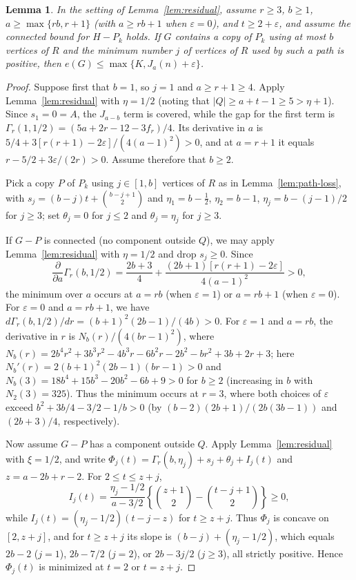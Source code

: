 \documentclass[10pt]{article}
\theoremstyle{compactplain}
\newtheorem{lemma}[theorem]{Lemma}
\theoremstyle{remark}\newtheorem{remark}[theorem]{Remark}
\begin{document}
\begin{lemma}\label{lem:positive-core-use}
In the setting of Lemma~\ref{lem:residual}, assume $r\ge3$, $b\ge1$,
$a\ge\max\{rb,r+1\}$ (with $a\ge rb+1$ when $\varepsilon=0$), and
$t\ge2+\varepsilon$, and assume the connected bound for $H-P_k$ holds.
If $G$ contains a copy of $P_k$ using at most $b$ vertices of $R$ and
the minimum number $j$ of vertices of $R$ used by such a path is
positive, then $e(G)\le\max\{K,J_a(n)+\varepsilon\}$.
\end{lemma}
\begin{proof}
Suppose first that $b=1$, so $j=1$ and $a\ge r+1\ge4$. Apply
Lemma~\ref{lem:residual} with $\eta=1/2$ (noting that
$|Q|\ge a+t-1\ge5>\eta+1$). Since $s_1=0=A$, the $J_{a-b}$ term is
covered, while the gap for the first term is
$\Gamma_r(1,1/2)=(5a+2r-12-3f_r)/4$. Its derivative in $a$ is
$5/4+3[r(r+1)-2\varepsilon]/(4(a-1)^2)>0$, and at $a=r+1$ it equals
$r-5/2+3\varepsilon/(2r)>0$. Assume therefore that $b\ge2$.

Pick a copy $P$ of $P_k$ using $j\in[1,b]$ vertices of $R$ as in
Lemma~\ref{lem:path-loss}, with $s_j=(b-j)t+\binom{b-j+1}{2}$ and
$\eta_1=b-\tfrac{1}{2}$, $\eta_2=b-1$, $\eta_j=b-(j-1)/2$ for $j\ge3$;
set $\theta_j=0$ for $j\le2$ and $\theta_j=\eta_j$ for $j\ge3$.

If $G-P$ is connected (no component outside $Q$), we may apply
Lemma~\ref{lem:residual} with $\eta=1/2$ and drop $s_j\ge0$. Since
\[
 \frac{\partial}{\partial a}\Gamma_r(b,1/2)
 =\frac{2b+3}{4}+\frac{(2b+1)[r(r+1)-2\varepsilon]}{4(a-1)^2}>0,
\]
the minimum over $a$ occurs at $a=rb$ (when $\varepsilon=1$) or
$a=rb+1$ (when $\varepsilon=0$). For $\varepsilon=0$ and $a=rb+1$, we
have $d\Gamma_r(b,1/2)/dr=(b+1)^2(2b-1)/(4b)>0$. For $\varepsilon=1$
and $a=rb$, the derivative in $r$ is $N_b(r)/(4(br-1)^2)$, where
$N_b(r)=2b^4r^2+3b^3r^2-4b^3r-6b^2r-2b^2-br^2+3b+2r+3$; here
$N_b'(r)=2(b+1)^2(2b-1)(br-1)>0$ and
$N_b(3)=18b^4+15b^3-20b^2-6b+9>0$ for $b\ge2$ (increasing in $b$ with
$N_2(3)=325$). Thus the minimum occurs at $r=3$, where both choices of
$\varepsilon$ exceed $b^2+3b/4-3/2-1/b>0$ (by $(b-2)(2b+1)/(2b(3b-1))$
and $(2b+3)/4$, respectively).

Now assume $G-P$ has a component outside $Q$. Apply
Lemma~\ref{lem:residual} with $\xi=1/2$, and write
$\Phi_j(t)=\Gamma_r(b,\eta_j)+s_j+\theta_j+I_j(t)$ and $z=a-2b+r-2$.
For $2\le t\le z+j$,
\begin{equation}\label{eq:cap}
 I_j(t)=\frac{\eta_j-1/2}{a-3/2}
 \left\{\binom{z+1}{2}-\binom{t-j+1}{2}\right\}\ge0,
\end{equation}
while $I_j(t)=(\eta_j-1/2)(t-j-z)$ for $t\ge z+j$. Thus $\Phi_j$ is
concave on $[2,z+j]$, and for $t\ge z+j$ its slope is
$(b-j)+(\eta_j-1/2)$, which equals $2b-2$ ($j=1$), $2b-7/2$ ($j=2$), or
$2b-3j/2$ ($j\ge3$), all strictly positive. Hence $\Phi_j(t)$ is
minimized at $t=2$ or $t=z+j$.


\end{proof}
\end{document}
